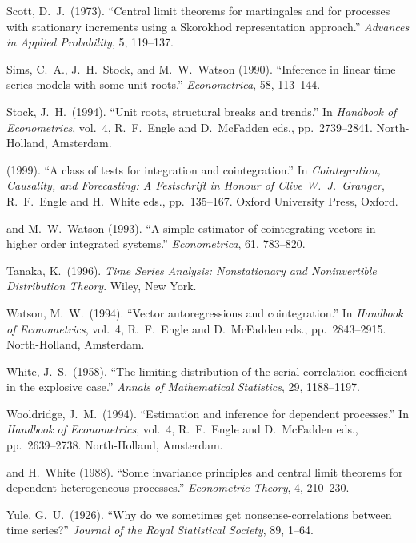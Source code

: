 \begin{description}
\item Scott, D.\ J.\ (1973). ``Central limit theorems for martingales and for processes with stationary increments using a Skorokhod representation approach.'' \emph{Advances in Applied Probability}, 5, 119--137.

\item Sims, C.\ A., J.\ H.\ Stock, and M.\ W.\ Watson (1990). ``Inference in linear time series models with some unit roots.'' \emph{Econometrica}, 58, 113--144.

\item Stock, J.\ H.\ (1994). ``Unit roots, structural breaks and trends.'' In \emph{Handbook of Econometrics}, vol.\ 4, R.\ F.\ Engle and D.\ McFadden eds., pp.\ 2739--2841. North-Holland, Amsterdam.

\item[] \hspace{2em} (1999). ``A class of tests for integration and cointegration.'' In \emph{Cointegration, Causality, and Forecasting: A Festschrift in Honour of Clive W.~J.\ Granger}, R.\ F.\ Engle and H.\ White eds., pp.\ 135--167. Oxford University Press, Oxford.

\item[] \hspace{2em} and M.\ W.\ Watson (1993). ``A simple estimator of cointegrating vectors in higher order integrated systems.'' \emph{Econometrica}, 61, 783--820.

\item Tanaka, K.\ (1996). \emph{Time Series Analysis: Nonstationary and Noninvertible Distribution Theory}. Wiley, New York.

\item Watson, M.\ W.\ (1994). ``Vector autoregressions and cointegration.'' In \emph{Handbook of Econometrics}, vol.\ 4, R.\ F.\ Engle and D.\ McFadden eds., pp.\ 2843--2915. North-Holland, Amsterdam.

\item White, J.\ S.\ (1958). ``The limiting distribution of the serial correlation coefficient in the explosive case.'' \emph{Annals of Mathematical Statistics}, 29, 1188--1197.

\item Wooldridge, J.\ M.\ (1994). ``Estimation and inference for dependent processes.'' In \emph{Handbook of Econometrics}, vol.\ 4, R.\ F.\ Engle and D.\ McFadden eds., pp.\ 2639--2738. North-Holland, Amsterdam.

\item[] \hspace{2em} and H.\ White (1988). ``Some invariance principles and central limit theorems for dependent heterogeneous processes.'' \emph{Econometric Theory}, 4, 210--230.

\item Yule, G.\ U.\ (1926). ``Why do we sometimes get nonsense-correlations between time series?'' \emph{Journal of the Royal Statistical Society}, 89, 1--64.
\end{description}
